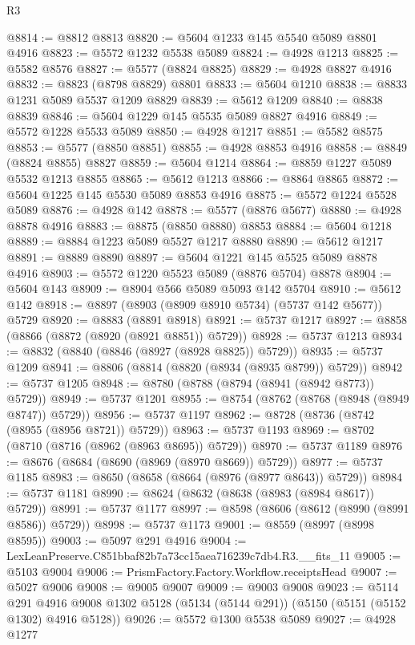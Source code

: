 \begin{lexlean}{R3}
\begin{coremodule}
@8814 := @8812 @8813
@8820 := @5604 @1233 @145 @5540 @5089 @8801 @4916
@8823 := @5572 @1232 @5538 @5089
@8824 := @4928 @1213
@8825 := @5582 @8576
@8827 := @5577 (@8824 @8825)
@8829 := @4928 @8827 @4916
@8832 := @8823 (@8798 @8829) @8801
@8833 := @5604 @1210
@8838 := @8833 @1231 @5089 @5537 @1209 @8829
@8839 := @5612 @1209
@8840 := @8838 @8839
@8846 := @5604 @1229 @145 @5535 @5089 @8827 @4916
@8849 := @5572 @1228 @5533 @5089
@8850 := @4928 @1217
@8851 := @5582 @8575
@8853 := @5577 (@8850 @8851)
@8855 := @4928 @8853 @4916
@8858 := @8849 (@8824 @8855) @8827
@8859 := @5604 @1214
@8864 := @8859 @1227 @5089 @5532 @1213 @8855
@8865 := @5612 @1213
@8866 := @8864 @8865
@8872 := @5604 @1225 @145 @5530 @5089 @8853 @4916
@8875 := @5572 @1224 @5528 @5089
@8876 := @4928 @142
@8878 := @5577 (@8876 @5677)
@8880 := @4928 @8878 @4916
@8883 := @8875 (@8850 @8880) @8853
@8884 := @5604 @1218
@8889 := @8884 @1223 @5089 @5527 @1217 @8880
@8890 := @5612 @1217
@8891 := @8889 @8890
@8897 := @5604 @1221 @145 @5525 @5089 @8878 @4916
@8903 := @5572 @1220 @5523 @5089 (@8876 @5704) @8878
@8904 := @5604 @143
@8909 := @8904 @566 @5089 @5093 @142 @5704
@8910 := @5612 @142
@8918 := @8897 (@8903 (@8909 @8910 @5734) (@5737 @142 @5677)) @5729
@8920 := @8883 (@8891 @8918)
@8921 := @5737 @1217
@8927 := @8858 (@8866 (@8872 (@8920 (@8921 @8851)) @5729))
@8928 := @5737 @1213
@8934 := @8832 (@8840 (@8846 (@8927 (@8928 @8825)) @5729))
@8935 := @5737 @1209
@8941 := @8806 (@8814 (@8820 (@8934 (@8935 @8799)) @5729))
@8942 := @5737 @1205
@8948 := @8780 (@8788 (@8794 (@8941 (@8942 @8773)) @5729))
@8949 := @5737 @1201
@8955 := @8754 (@8762 (@8768 (@8948 (@8949 @8747)) @5729))
@8956 := @5737 @1197
@8962 := @8728 (@8736 (@8742 (@8955 (@8956 @8721)) @5729))
@8963 := @5737 @1193
@8969 := @8702 (@8710 (@8716 (@8962 (@8963 @8695)) @5729))
@8970 := @5737 @1189
@8976 := @8676 (@8684 (@8690 (@8969 (@8970 @8669)) @5729))
@8977 := @5737 @1185
@8983 := @8650 (@8658 (@8664 (@8976 (@8977 @8643)) @5729))
@8984 := @5737 @1181
@8990 := @8624 (@8632 (@8638 (@8983 (@8984 @8617)) @5729))
@8991 := @5737 @1177
@8997 := @8598 (@8606 (@8612 (@8990 (@8991 @8586)) @5729))
@8998 := @5737 @1173
@9001 := @8559 (@8997 (@8998 @8595))
@9003 := @5097 @291 @4916
@9004 := LexLeanPreserve.C851bbaf82b7a73cc15aea716239c7db4.R3.__fits_11
@9005 := @5103 @9004
@9006 := PrismFactory.Factory.Workflow.receiptsHead
@9007 := @5027 @9006
@9008 := @9005 @9007
@9009 := @9003 @9008
@9023 := @5114
    @291
    @4916
    @9008
    @1302
    @5128
    (@5134 (@5144 @291))
    (@5150 (@5151 (@5152 @1302) @4916 @5128))
@9026 := @5572 @1300 @5538 @5089
@9027 := @4928 @1277

\end{coremodule}
\end{lexlean}
